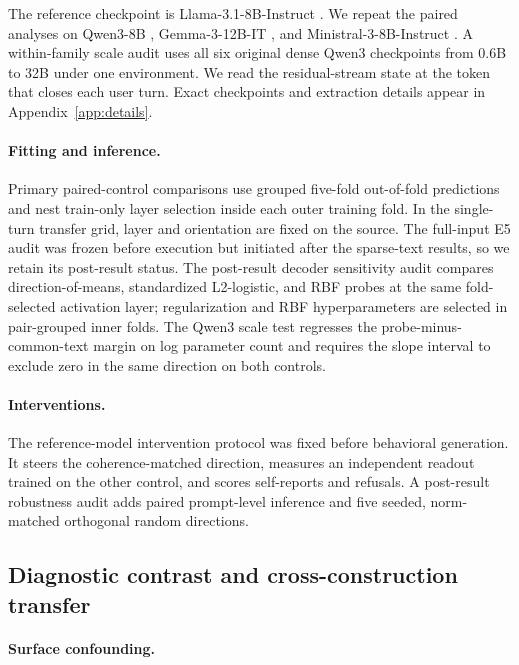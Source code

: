 \documentclass{article}
\begin{document}
The reference checkpoint is Llama-3.1-8B-Instruct \citep{dubey2024llama}. We
repeat the paired analyses on Qwen3-8B \citep{yang2025qwen3}, Gemma-3-12B-IT
\citep{gemmateam2025gemma3}, and Ministral-3-8B-Instruct
\citep{liu2026ministral3}. A within-family scale audit uses all six original
dense Qwen3 checkpoints from 0.6B to 32B under one environment. We read the
residual-stream state at the token that closes each user turn. Exact checkpoints
and extraction details appear in Appendix~\ref{app:details}.

\paragraph{Fitting and inference.}
Primary paired-control comparisons use grouped five-fold out-of-fold
predictions and nest train-only layer selection inside each outer training fold.
In the single-turn transfer grid, layer and orientation are fixed on the source.
The full-input E5 audit was frozen before execution but initiated after the
sparse-text results, so we retain its post-result status. The post-result decoder
sensitivity audit compares direction-of-means, standardized L2-logistic, and RBF
probes at the same fold-selected activation layer; regularization and RBF
hyperparameters are selected in pair-grouped inner folds. The Qwen3 scale test
regresses the probe-minus-common-text margin on log parameter count and requires
the slope interval to exclude zero in the same direction on both controls.

\paragraph{Interventions.}
The reference-model intervention protocol was fixed before behavioral
generation. It steers the coherence-matched direction, measures an independent
readout trained on the other control, and scores self-reports and refusals. A
post-result robustness audit adds paired prompt-level inference and five seeded,
norm-matched orthogonal random directions.

\subsection{Diagnostic contrast and cross-construction transfer}

\paragraph{Surface confounding.}
\end{document}
